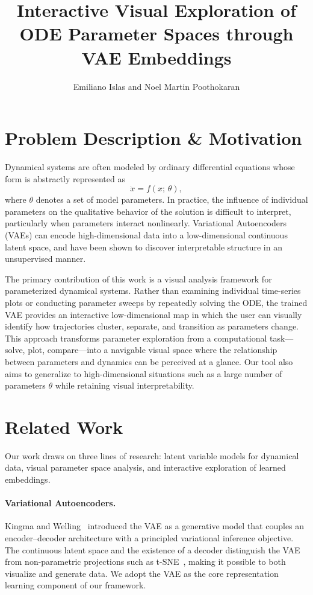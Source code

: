 \documentclass{article}
\title{Interactive Visual Exploration of ODE Parameter Spaces through VAE Embeddings}
\author{Emiliano Islas and Noel Martin Poothokaran}
\begin{document}
\maketitle


\section{Problem Description \& Motivation}


Dynamical systems are often modeled by ordinary differential equations whose
form is abstractly represented as
\begin{equation}
    \dot{x} = f(x;\,\theta),
\end{equation}
where $\theta$ denotes a set of model parameters. In practice, the influence
of individual parameters on the qualitative behavior of the solution is
difficult to interpret, particularly when parameters interact nonlinearly.
Variational Autoencoders (VAEs) can encode high-dimensional data into a
low-dimensional continuous latent space, and have been shown to discover
interpretable structure in an unsupervised manner. 

The primary contribution of this work is a visual analysis framework
for parameterized dynamical systems. Rather than examining individual
time-series plots or conducting parameter sweeps by repeatedly solving the ODE,
the trained VAE provides an interactive low-dimensional map in which the user
can visually identify how trajectories cluster, separate, and transition as
parameters change. This approach transforms parameter exploration from a
computational task---solve, plot, compare---into a navigable visual space where
the relationship between parameters and dynamics can be perceived at a glance. Our tool also aims to generalize to high-dimensional situations such as a large number of parameters $\theta$ while retaining visual interpretability.


\section{Related Work}

Our work draws on three lines of research: latent variable models for
dynamical data, visual parameter space analysis, and interactive exploration of
learned embeddings.

\paragraph{Variational Autoencoders.}
Kingma and Welling~\cite{kingma2014auto} introduced the VAE as a generative
model that couples an encoder--decoder architecture with a principled
variational inference objective. The continuous latent space and the existence
of a decoder distinguish the VAE from non-parametric projections such as
t-SNE~\cite{vandermaaten2008visualizing}, making it possible to both visualize
and generate data. We adopt the VAE as the core representation learning
component of our framework.
\end{document}
